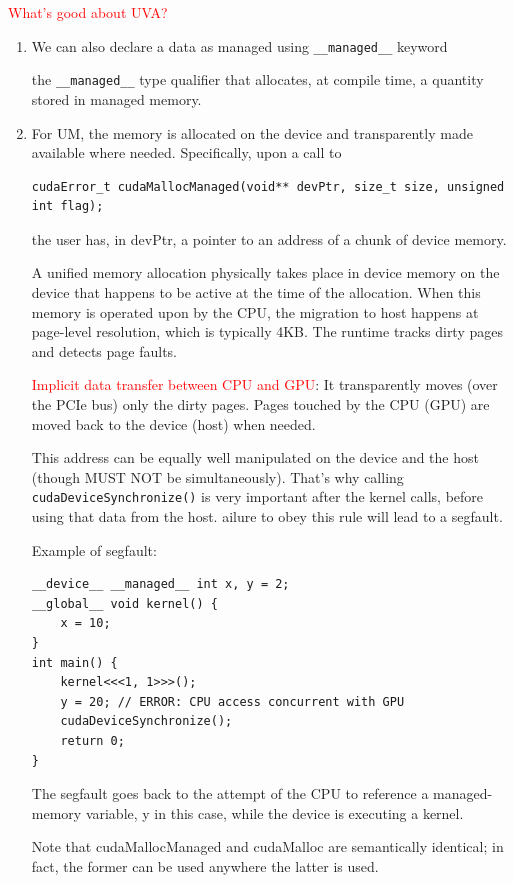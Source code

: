 \textcolor{red}{What's good about UVA?}
\begin{enumerate}
  \item We can also declare a data as managed using \verb!__managed__! keyword
  \label{sec:__managed__-keyword}
  
  the \verb!__managed__! type qualifier that allocates, at compile time, a quantity stored in managed memory.
  
  
  \item For UM, the memory is allocated on the device and transparently made
  available where needed. Specifically, upon a call to
  
\begin{verbatim}
cudaError_t cudaMallocManaged(void** devPtr, size_t size, unsigned int flag);
\end{verbatim}  
the user has, in devPtr, a pointer to an address of a chunk of device memory.

A unified memory allocation physically takes place in device memory on the
device that happens to be active at the time of the allocation. When this memory
is operated upon by the CPU, the migration to host happens at page-level
resolution, which is typically 4KB. The runtime tracks dirty pages and detects page faults.

\textcolor{red}{Implicit data transfer between CPU and GPU}:
It transparently moves (over the PCIe bus) only the dirty pages. Pages touched
by the CPU (GPU) are moved back to the device (host) when needed.
 

This address can be equally well manipulated on the device and the host (though
MUST NOT be simultaneously).
That's why calling \verb!cudaDeviceSynchronize()! is very important after the
kernel calls, before using that data from the host.
ailure to obey this rule will lead to a segfault.

Example of segfault:
\begin{verbatim}
__device__ __managed__ int x, y = 2;
__global__ void kernel() {
    x = 10;
}
int main() {
    kernel<<<1, 1>>>();
    y = 20; // ERROR: CPU access concurrent with GPU
    cudaDeviceSynchronize();
    return 0;
}
\end{verbatim}
The segfault goes back to the attempt of the CPU to reference a managed-memory variable, y in this case, while the device is executing a kernel. 

Note that cudaMallocManaged and cudaMalloc are semantically identical; in fact,
the former can be used anywhere the latter is used.


\end{enumerate}
